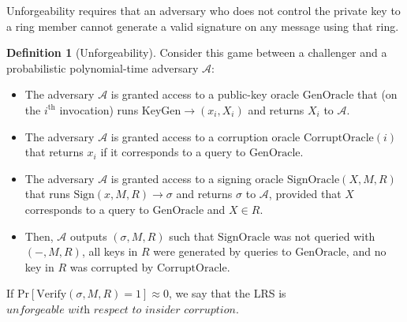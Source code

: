 \documentclass{article}
\newcommand{\A}{\mathcal{A}}
\theoremstyle{definition}
\newtheorem{definition}{Definition}
\begin{document}
Unforgeability requires that an adversary who does not control the private key to a ring member cannot generate a valid signature on any message using that ring.
\begin{definition}[Unforgeability]
Consider this game between a challenger and a probabilistic polynomial-time adversary $\A$:
\begin{itemize}
\item The adversary $\A$ is granted access to a public-key oracle $\text{GenOracle}$ that (on the $i^\text{th}$ invocation) runs $\text{KeyGen} \to (x_i,X_i)$ and returns $X_i$ to $\A$.
\item The adversary $\A$ is granted access to a corruption oracle $\text{CorruptOracle}(i)$ that returns $x_i$ if it corresponds to a query to $\text{GenOracle}$.
\item The adversary $\A$ is granted access to a signing oracle $\text{SignOracle}(X,M,R)$ that runs $\text{Sign}(x,M,R) \to \sigma$ and returns $\sigma$ to $\A$, provided that $X$ corresponds to a query to $\text{GenOracle}$ and $X \in R$.
\item Then, $\A$ outputs $(\sigma,M,R)$ such that $\text{SignOracle}$ was not queried with $(-,M,R)$, all keys in $R$ were generated by queries to $\text{GenOracle}$, and no key in $R$ was corrupted by $\text{CorruptOracle}$.
\end{itemize}
If $\text{Pr}[ \text{Verify}(\sigma,M,R) = 1 ] \approx 0$, we say that the LRS is $\textit{unforgeable with respect to insider corruption}$.
\end{definition}
\end{document}
